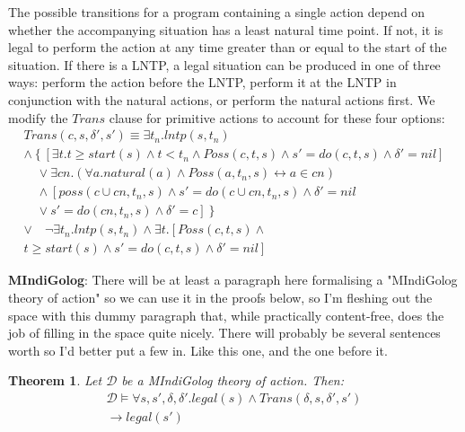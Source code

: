 \documentclass[letterpaper]{article}
\newtheorem{theorem}{Theorem}
\begin{document}
The possible transitions for a program containing a single action
depend on whether the accompanying situation has a least natural time
point. If not, it is legal to perform the action at any time greater
than or equal to the start of the situation. If there is a LNTP,
a legal situation can be produced in one of three ways: perform the
action before the LNTP, perform it at the LNTP in conjunction with
the natural actions, or perform the natural actions first.  We modify
the $Trans$ clause for primitive actions to account for these four options:
\begin{multline}
\label{eqn:trans_prim_new}
Trans(c,s,\delta',s')\equiv \exists t_{n}. lntp(s,t_{n}) \\
  \wedge \left\{ \left[\exists t.t\geq start(s)\wedge t<t_{n}\wedge Poss(c,t,s)\wedge s'=do(c,t,s)\wedge\delta'=nil\right]\right.\\
   \quad\vee\exists cn.\left(\forall a.natural(a)\wedge Poss(a,t_{n},s)\leftrightarrow a\in cn\right)\\
  \quad\wedge\left[poss(c\cup cn,t_{n},s)\wedge s'=do(c\cup cn,t_{n},s)\wedge\delta'=nil\right.\\
  \quad\vee\left.\left.s'=do(cn,t_{n},s)\wedge\delta'=c\right]\right\}\\
  \vee\quad\neg\exists t_{n}.lntp(s,t_{n})\wedge\exists t.\left[Poss(c,t,s)\wedge\right.\\
  \left.t\geq start(s)\wedge s'=do(c,t,s)\wedge\delta'=nil\right]
\end{multline}

\textbf{MIndiGolog}:  There will be at least a paragraph here formalising
a "MIndiGolog theory of action" so we can use it in the proofs below, so
I'm fleshing out the space with this dummy paragraph that, while practically
content-free, does the job of filling in the space quite nicely.  There
will probably be several sentences worth so I'd better put a few in.  Like
this one, and the one before it.

\begin{theorem}
\label{thm:trans_legal}
Let $\mathcal{D}$ be a MIndiGolog theory of action. Then:
\begin{multline*}
\mathcal{D} \models \forall s,s',\delta,\delta'.legal(s)\wedge Trans(\delta,s,\delta',s')\\
\rightarrow legal(s')
\end{multline*}
\end{theorem}
\end{document}
